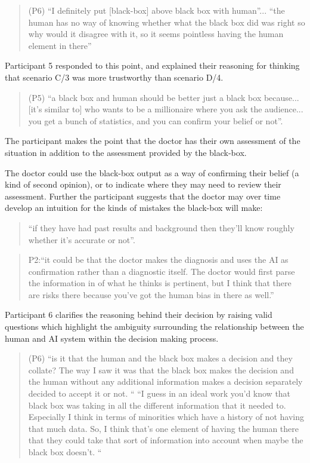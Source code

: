 \documentclass[manuscript,screen,review]{acmart}
\begin{document}
\begin{quote}
(P6) “I definitely put [black-box] above black box with human”... 
“the human has no way of knowing whether what the black box did was right so why would it disagree with it, so it seems pointless having the human element in there”
\end{quote}

Participant 5 responded to this point, and explained their reasoning for thinking that scenario C/3 was more trustworthy than scenario D/4. 

\begin{quote}
(P5) “a black box and human should be better just a black box because... [it's similar to] who wants to be a millionaire where you ask the audience... you get a bunch of statistics, and you can confirm your belief or not”. 
\end{quote}

The participant makes the point that the doctor has their own assessment of the situation in addition to the assessment provided by the black-box.

The doctor could use the black-box output as a way of confirming their belief (a kind of second opinion), or to indicate where they may need to review their assessment. Further the participant suggests that the doctor may over time develop an intuition for the kinds of mistakes the black-box will make:

\begin{quote}
“if they have had past results and background then they’ll know roughly whether it’s accurate or not”.
\end{quote}

\begin{quote}
P2:“it could be that the doctor makes the diagnosis and uses the AI as confirmation rather than a diagnostic itself. The doctor would first parse the information in of what he thinks is pertinent, but I think that there are risks there because you’ve got the human bias in there as well.”
\end{quote}


Participant 6 clarifies the reasoning behind their decision by raising valid questions which highlight the ambiguity surrounding the relationship between the  human and AI system within the decision making process.

\begin{quote}
(P6) “is it that the human and the black box makes a decision and they collate? The way I saw it was that the black box makes the decision and the human without any additional information makes a decision separately decided to accept it or not. “
“I guess in an ideal work you'd know that black box was taking in all the different information that it needed to. Especially I think in terms of minorities which have a history of not having that much data. So, I think that’s one element of having the human there that they could take that sort of information into account when maybe the black box doesn’t. “
\end{quote}
\end{document}
